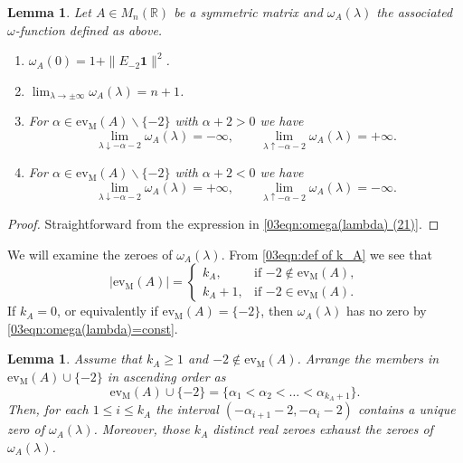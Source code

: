 \documentclass[12pt,a4paper]{article}
\newtheorem{lemma}[theorem]{Lemma}
\newcommand{\1}{{\bm 1}}
\numberwithin{equation}{section}
\begin{document}
\begin{lemma}\label{03lem:behaviour of omega(lambda)}
Let $A\in M_n(\mathbb{R})$ be a symmetric matrix
and $\omega_A(\lambda)$ the associated $\omega$-function
defined as above. 
%
\begin{enumerate}
\item[\upshape (1)] 
$\omega_A(0)=1+\|E_{-2}\mathbf{1}\|^2$.
\item[\upshape (2)] 
$\displaystyle\lim_{\lambda\rightarrow\pm\infty}\omega_A(\lambda)=n+1$.
\item[\upshape (3)]
For $\alpha\in\mathrm{ev}_{\mathrm{M}}(A)\backslash\{-2\}$ with $\alpha+2>0$
we have
\[
\lim_{\lambda\downarrow -\alpha-2}\omega_A(\lambda)=-\infty,
\qquad
\lim_{\lambda\uparrow -\alpha-2}\omega_A(\lambda)=+\infty.
\]
\item[\upshape (4)]
For $\alpha\in\mathrm{ev}_{\mathrm{M}}(A)\backslash\{-2\}$ with $\alpha+2<0$
we have
\[
\lim_{\lambda\downarrow -\alpha-2}\omega_A(\lambda)=+\infty,
\qquad
\lim_{\lambda\uparrow -\alpha-2}\omega_A(\lambda)=-\infty.
\]
\end{enumerate}
\end{lemma}

\begin{proof}
Straightforward from the expression in
\eqref{03eqn:omega(lambda) (21)}.
\end{proof}

We will examine the zeroes of $\omega_A(\lambda)$.
From \eqref{03eqn:def of k_A} we see that
\[
|\mathrm{ev}_{\mathrm{M}}(A)|=
\begin{cases}
k_A, & \text{if $-2\not\in \mathrm{ev}_{\mathrm{M}}(A)$}, \\
k_A+1, & \text{if $-2\in \mathrm{ev}_{\mathrm{M}}(A)$}.
\end{cases}
\]
If $k_A=0$, or equivalently if
$\mathrm{ev}_{\mathrm{M}}(A)=\{-2\}$,
then $\omega_A(\lambda)$ has no zero 
by \eqref{03eqn:omega(lambda)=const}.


\begin{lemma}\label{03lem:zeroes of omega(lambda) (1)}
Assume that $k_A\ge1$ and $-2\not\in\mathrm{ev}_{\mathrm{M}}(A)$.
Arrange the members in $\mathrm{ev}_{\mathrm{M}}(A)\cup \{-2\}$
in ascending order as
\[
\mathrm{ev}_{\mathrm{M}}(A)\cup \{-2\}
=\{\alpha_1<\alpha_2<\dots<\alpha_{k_A+1}\}.
\]
Then, for each $1\le i\le k_A$ the interval
$(-\alpha_{i+1}-2,-\alpha_i-2)$
contains a unique zero of $\omega_A(\lambda)$.
Moreover, those $k_A$ distinct real zeroes
exhaust the zeroes of $\omega_A(\lambda)$.
\end{lemma}
\end{document}
